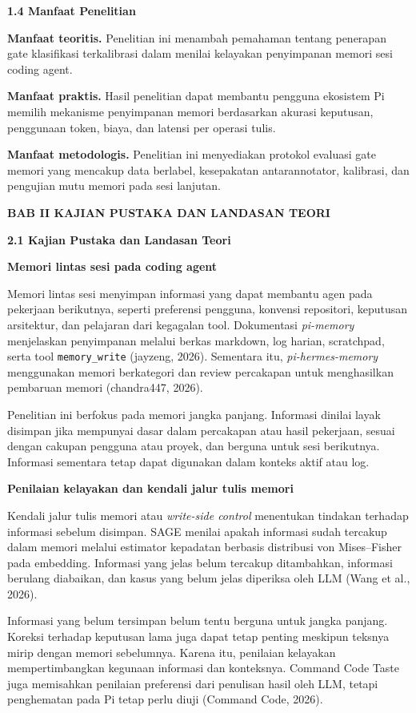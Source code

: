 \documentclass[
]{article}
\begin{document}
\textbf{1.4 Manfaat Penelitian}\label{sec:1.4}

\textbf{Manfaat teoritis.} Penelitian ini menambah pemahaman tentang
penerapan gate klasifikasi terkalibrasi dalam menilai kelayakan
penyimpanan memori sesi coding agent.

\textbf{Manfaat praktis.} Hasil penelitian dapat membantu pengguna
ekosistem Pi memilih mekanisme penyimpanan memori berdasarkan akurasi
keputusan, penggunaan token, biaya, dan latensi per operasi tulis.

\textbf{Manfaat metodologis.} Penelitian ini menyediakan protokol
evaluasi gate memori yang mencakup data berlabel, kesepakatan
antarannotator, kalibrasi, dan pengujian mutu memori pada sesi lanjutan.

\clearpage
\textbf{BAB II KAJIAN PUSTAKA DAN LANDASAN TEORI}\label{sec:bab2}

\textbf{2.1 Kajian Pustaka dan Landasan Teori}\label{sec:2.1}

\textbf{Memori lintas sesi pada coding agent}

Memori lintas sesi menyimpan informasi yang dapat membantu agen pada pekerjaan berikutnya, seperti preferensi pengguna, konvensi repositori, keputusan arsitektur, dan pelajaran dari kegagalan tool. Dokumentasi \emph{pi-memory} menjelaskan penyimpanan melalui berkas markdown, log harian, scratchpad, serta tool \texttt{memory\_write} (jayzeng, 2026). Sementara itu, \emph{pi-hermes-memory} menggunakan memori berkategori dan review percakapan untuk menghasilkan pembaruan memori (chandra447, 2026).

Penelitian ini berfokus pada memori jangka panjang. Informasi dinilai layak disimpan jika mempunyai dasar dalam percakapan atau hasil pekerjaan, sesuai dengan cakupan pengguna atau proyek, dan berguna untuk sesi berikutnya. Informasi sementara tetap dapat digunakan dalam konteks aktif atau log.

\textbf{Penilaian kelayakan dan kendali jalur tulis memori}

Kendali jalur tulis memori atau \emph{write-side control} menentukan tindakan terhadap informasi sebelum disimpan. SAGE menilai apakah informasi sudah tercakup dalam memori melalui estimator kepadatan berbasis distribusi von Mises--Fisher pada embedding. Informasi yang jelas belum tercakup ditambahkan, informasi berulang diabaikan, dan kasus yang belum jelas diperiksa oleh LLM (Wang et al., 2026).

Informasi yang belum tersimpan belum tentu berguna untuk jangka panjang. Koreksi terhadap keputusan lama juga dapat tetap penting meskipun teksnya mirip dengan memori sebelumnya. Karena itu, penilaian kelayakan mempertimbangkan kegunaan informasi dan konteksnya. Command Code Taste juga memisahkan penilaian preferensi dari penulisan hasil oleh LLM, tetapi penghematan pada Pi tetap perlu diuji (Command Code, 2026).
\end{document}
